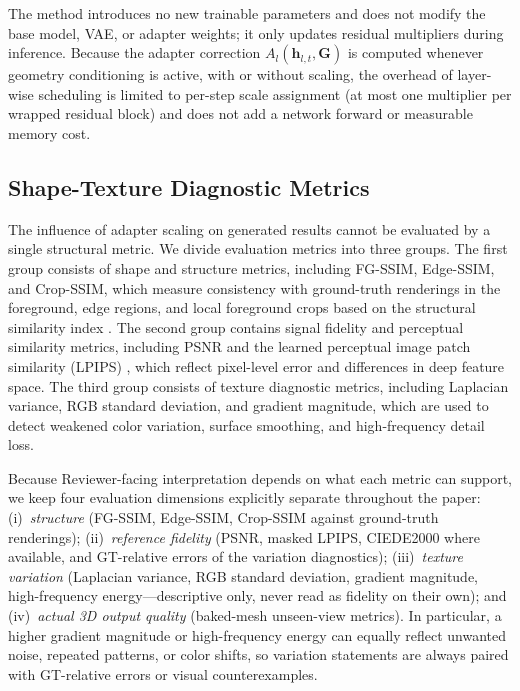 \documentclass[times,twocolumn,final]{elsarticle}
\begin{document}
The method introduces no new trainable parameters and does not modify the
base model, VAE, or adapter weights; it only updates residual multipliers
during inference. Because the adapter correction $A_l(\mathbf{h}_{l,t},
\mathbf{G})$ is computed whenever geometry conditioning is active, with or
without scaling, the overhead of layer-wise scheduling is limited to per-step
scale assignment (at most one multiplier per wrapped residual block) and does
not add a network forward or measurable memory cost.

\subsection{Shape-Texture Diagnostic Metrics}
\label{subsec:metrics}

The influence of adapter scaling on generated results cannot be evaluated by a single structural metric. We divide evaluation metrics into three groups. The first group consists of shape and structure metrics, including FG-SSIM, Edge-SSIM, and Crop-SSIM, which measure consistency with ground-truth renderings in the foreground, edge regions, and local foreground crops based on the structural similarity index \cite{wang2004ssim}. The second group contains signal fidelity and perceptual similarity metrics, including PSNR and the learned perceptual image patch similarity (LPIPS) \cite{zhang2018lpips}, which reflect pixel-level error and differences in deep feature space. The third group consists of texture diagnostic metrics, including Laplacian variance, RGB standard deviation, and gradient magnitude, which are used to detect weakened color variation, surface smoothing, and high-frequency detail loss.

Because Reviewer-facing interpretation depends on what each metric can
support, we keep four evaluation dimensions explicitly separate throughout
the paper: (i)\ \emph{structure} (FG-SSIM, Edge-SSIM, Crop-SSIM against
ground-truth renderings); (ii)\ \emph{reference fidelity} (PSNR, masked
LPIPS, CIEDE2000 where available, and GT-relative errors of the variation
diagnostics); (iii)\ \emph{texture variation} (Laplacian variance, RGB
standard deviation, gradient magnitude, high-frequency energy---descriptive
only, never read as fidelity on their own); and (iv)\ \emph{actual 3D
output quality} (baked-mesh unseen-view metrics). In particular, a higher
gradient magnitude or high-frequency energy can equally reflect unwanted
noise, repeated patterns, or color shifts, so variation statements are always
paired with GT-relative errors or visual counterexamples.
\end{document}
